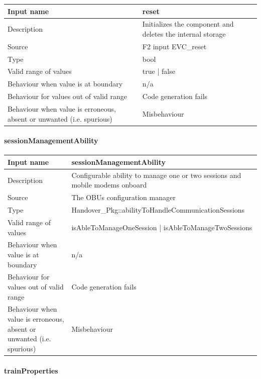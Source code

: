 \begin{longtable}{p{}p{}}
	\toprule
	Input name				& reset \\
	\midrule
	Description				& Initializes the component and deletes the internal storage \\
	\midrule
	Source					& F2 input EVC\_reset \\ 
	\midrule
	Type					& bool \\
	\midrule
	Valid range of values	& true | false \\
	\midrule
	Behaviour when value is at boundary	& n/a \\
	\midrule
	Behaviour for values out of valid range	& Code generation fails \\
	\midrule
	Behaviour when value is erroneous, absent or unwanted (i.e. spurious) & Misbehaviour \\
	\bottomrule
\end{longtable}

\paragraph{sessionManagementAbility}

\begin{longtable}{p{}p{}}
	\toprule
	Input name				& sessionManagementAbility \\
	\midrule
	Description				& Configurable ability to manage one or two sessions and mobile modems onboard \\
	\midrule
	Source					& The OBUs configuration manager \\ 
	\midrule
	Type					& Handover\_Pkg::abilityToHandleCommunicationSessions \\
	\midrule
	Valid range of values	& isAbleToManageOneSession | isAbleToManageTwoSessions \\
	\midrule
	Behaviour when value is at boundary	& n/a \\
	\midrule
	Behaviour for values out of valid range	& Code generation fails \\
	\midrule
	Behaviour when value is erroneous, absent or unwanted (i.e. spurious) & Misbehaviour \\
	\bottomrule
\end{longtable}

\paragraph{trainProperties}

